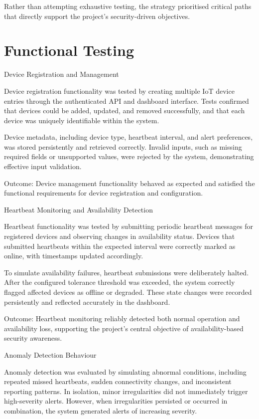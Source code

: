 Rather than attempting exhaustive testing, the strategy prioritised critical paths that directly support the project's security-driven objectives.

\section{Functional Testing}

Device Registration and Management

Device registration functionality was tested by creating multiple IoT device entries through the authenticated API and dashboard interface. Tests confirmed that devices could be added, updated, and removed successfully, and that each device was uniquely identifiable within the system.

Device metadata, including device type, heartbeat interval, and alert preferences, was stored persistently and retrieved correctly. Invalid inputs, such as missing required fields or unsupported values, were rejected by the system, demonstrating effective input validation.

Outcome: Device management functionality behaved as expected and satisfied the functional requirements for device registration and configuration.

Heartbeat Monitoring and Availability Detection

Heartbeat functionality was tested by submitting periodic heartbeat messages for registered devices and observing changes in availability status. Devices that submitted heartbeats within the expected interval were correctly marked as online, with timestamps updated accordingly.

To simulate availability failures, heartbeat submissions were deliberately halted. After the configured tolerance threshold was exceeded, the system correctly flagged affected devices as offline or degraded. These state changes were recorded persistently and reflected accurately in the dashboard.

Outcome: Heartbeat monitoring reliably detected both normal operation and availability loss, supporting the project's central objective of availability-based security awareness.

Anomaly Detection Behaviour

Anomaly detection was evaluated by simulating abnormal conditions, including repeated missed heartbeats, sudden connectivity changes, and inconsistent reporting patterns. In isolation, minor irregularities did not immediately trigger high-severity alerts. However, when irregularities persisted or occurred in combination, the system generated alerts of increasing severity.

